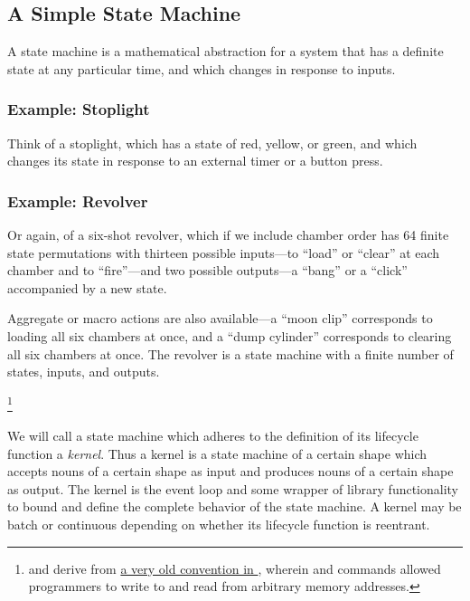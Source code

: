 \subsection{A Simple State Machine}

A state machine is a mathematical abstraction for a system that has a definite state at any particular time, and which changes in response to inputs.

\subsubsection{Example:  Stoplight}

Think of a stoplight, which has a state of red, yellow, or green, and which changes its state in response to an external timer or a button press.


\subsubsection{Example:  Revolver}

Or again, of a six-shot revolver, which if we include chamber order has 64 finite state permutations with thirteen possible inputs---to ``load'' or ``clear'' at each chamber and to ``fire''---and two possible outputs---a ``bang'' or a ``click'' accompanied by a new state.


Aggregate or macro actions are also available---a ``moon clip'' corresponds to loading all six chambers at once, and a ``dump cylinder'' corresponds to clearing all six chambers at once.  The revolver is a state machine with a finite number of states, inputs, and outputs.

\footnote{ and  derive from \href{https://en.wikipedia.org/wiki/PEEK_and_POKE}{a very old convention in }, wherein  and  commands allowed programmers to write to and read from arbitrary memory addresses.}

We will call a state machine which adheres to the definition of its lifecycle function a \emph{kernel}.  Thus a kernel is a state machine of a certain shape which accepts nouns of a certain shape as input and produces nouns of a certain shape as output.  The kernel is the event loop and some wrapper of library functionality to bound and define the complete behavior of the state machine.  A kernel may be batch or continuous depending on whether its lifecycle function is reentrant.

